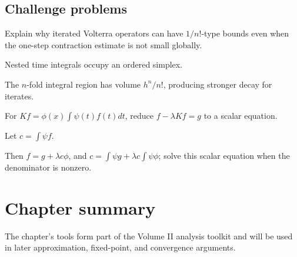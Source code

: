 \subsection*{Challenge problems}

\begin{exercise}\label{exr:ii18-expand-15}
Explain why iterated Volterra operators can have \(1/n!\)-type bounds even when the one-step contraction estimate is not small globally.
\end{exercise}
\begin{hint}
Nested time integrals occupy an ordered simplex.
\end{hint}
\begin{solution}
The \(n\)-fold integral region has volume \(h^n/n!\), producing stronger decay for iterates.
\end{solution}

\begin{exercise}\label{exr:ii18-expand-16}
For \(Kf=\phi(x)\int\psi(t)f(t)dt\), reduce \(f-\lambda Kf=g\) to a scalar equation.
\end{exercise}
\begin{hint}
Let \(c=\int\psi f\).
\end{hint}
\begin{solution}
Then \(f=g+\lambda c\phi\), and \(c=\int\psi g+\lambda c\int\psi\phi\); solve this scalar equation when the denominator is nonzero.
\end{solution}
\section*{Chapter summary}
The chapter's tools form part of the Volume II analysis toolkit and will be used in later approximation, fixed-point, and convergence arguments.
